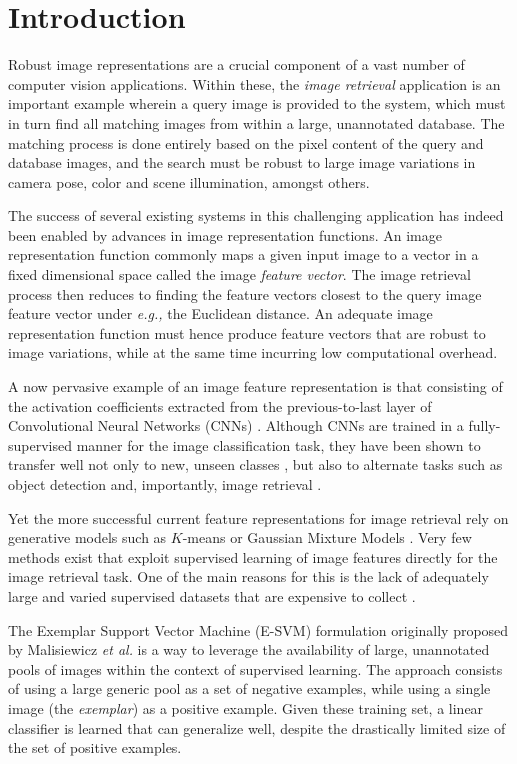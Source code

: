 \section{Introduction}

Robust image representations are a crucial component of a vast number of computer vision applications. Within these, the \emph{image retrieval} application is an important example wherein a query image is provided to the system, which must in turn find all matching images from within a large, unannotated database. The matching process is done entirely based on the pixel content of the query and database images, and the search must be robust to large image variations in camera pose, color and scene illumination, amongst others.

The success of several existing systems in this challenging application has indeed been enabled by advances in  image representation functions. An image representation function commonly maps a given input image to a vector in a fixed dimensional space called the image \emph{feature vector}. The image retrieval process then reduces to finding the feature vectors closest to the query image feature vector under {\it e.g.,} the Euclidean distance. An adequate image representation function must hence produce feature vectors that are robust to image variations, while at the same time incurring low computational overhead.

A now pervasive example of an image feature representation is that consisting of the activation coefficients extracted from the previous-to-last layer of Convolutional Neural Networks (CNNs) \cite{}. Although CNNs are trained in a fully-supervised manner for the image classification task, they have been shown to transfer well not only to new, unseen classes \cite{Oquab,Kulkarni,ChatfieldDevil}, but also to alternate tasks such as object detection \cite{RCNN} and, importantly, image retrieval \cite{AstoundingBaseline}.

Yet the more successful current feature representations for image retrieval rely on generative models such as $K$-means \cite{VLAD} or Gaussian Mixture Models \cite{Fisher}. Very few methods \cite{NetVLAD,Aakanksha,Cagdas} exist that exploit supervised learning of image features directly for the image retrieval task. One of the main reasons for this is the lack of adequately large and varied supervised datasets that are expensive to collect \cite{NetVLAD}.

The Exemplar Support Vector Machine (E-SVM) formulation originally proposed by Malisiewicz {\it et al.} \cite{Malisiewicz} is a way to leverage the availability of large, unannotated pools of images within the context of supervised learning. The approach consists of using a large generic pool as a set of negative examples, while using a single image (the \emph{exemplar}) as a positive example. Given these training set, a linear classifier is learned that can  generalize well, despite the drastically limited size of the set of positive examples. 

